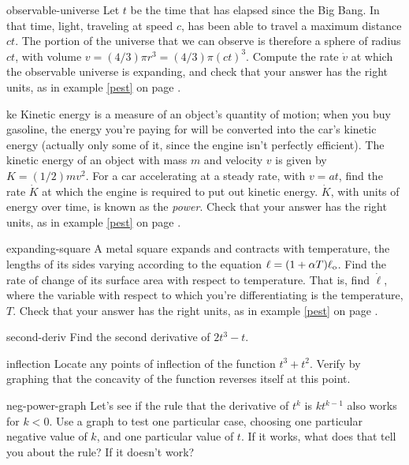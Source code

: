 \begin{hwsection}
\begin{hwwithsoln}{observable-universe}
Let $t$ be the time that has elapsed since the Big Bang. In that time, light, traveling at speed
$c$, has been able to travel a maximum distance $ct$. The portion of the universe that we can observe
is therefore a sphere of radius $ct$, with volume $v=(4/3)\pi r^3=(4/3)\pi(ct)^3$. Compute the rate
$\dot{v}$ at which the observable universe is expanding, and check that your answer has the right units,
as in example \ref{pest} on page \pageref{pest}.
\end{hwwithsoln}

\begin{hwwithsoln}{ke}
Kinetic energy is a measure of an object's quantity of motion; when you buy gasoline,  the
energy you're paying for will be converted into the car's kinetic energy (actually only some of
it, since the engine isn't perfectly efficient). The kinetic energy of an object with mass
$m$ and velocity $v$ is given by $K=(1/2)mv^2$. For a car accelerating at a steady rate, with
$v=at$, find the rate $\dot{K}$ at which the engine is required to put out kinetic energy.
$\dot{K}$, with units of energy over time, is known as the \emph{power}.
Check that your answer has the right units, as in example \ref{pest} on page \pageref{pest}.
\end{hwwithsoln}

\begin{hwwithsoln}{expanding-square}
A metal square expands and contracts with temperature, the lengths of its sides varying according to the
equation $\ell=(1+\alpha T)\ell_{\textup{o}}$. Find the rate of change of its surface area with respect to
temperature. That is, find $\dot{\ell}$, where the variable with respect to which you're differentiating
is the temperature, $T$.  
Check that your answer has the right units, as in example \ref{pest} on page \pageref{pest}.
\end{hwwithsoln}

\begin{hwwithsoln}{second-deriv}
Find the second derivative of $2t^3-t$.
\end{hwwithsoln}

\begin{hwwithsoln}{inflection}
Locate any points of inflection of the function $t^3+t^2$. Verify by graphing that the concavity
of the function reverses itself at this point.
\end{hwwithsoln}

\begin{hwwithsoln}{neg-power-graph}
Let's see if the rule that the derivative of $t^k$ is $kt^{k-1}$ also works for $k<0$.
Use a graph to test one particular case, choosing one particular negative value of $k$, and one 
particular value of $t$. If it works, what does that tell you about the rule? If it
doesn't work?
\end{hwwithsoln}


\end{hwsection}
